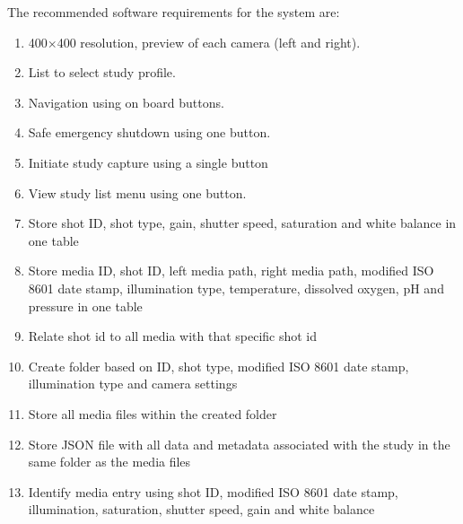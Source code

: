 The recommended software requirements for the system are:
\begin{enumerate}
	\item 400$\times$400 resolution, preview of each camera (left and right).
	\item List to select study profile.
	\item Navigation using on board buttons.
	\item Safe emergency shutdown using one button.
	\item Initiate study capture using a single button
	\item View study list menu using one button.
	\item Store shot ID, shot type, gain, shutter speed, saturation and white balance in one table
	\item Store media ID, shot ID, left media path, right media path, modified ISO 8601 date stamp, illumination type, temperature, dissolved oxygen, pH and pressure in one table
	\item Relate shot id to all media with that specific shot id
	\item Create folder based on ID, shot type, modified ISO 8601 date stamp, illumination type and camera settings
	\item Store all media files within the created folder
	\item Store JSON file with all data and metadata associated with the study in the same folder as the media files
	\item Identify media entry using shot ID, modified ISO 8601 date stamp, illumination, saturation, shutter speed, gain and white balance
\end{enumerate}